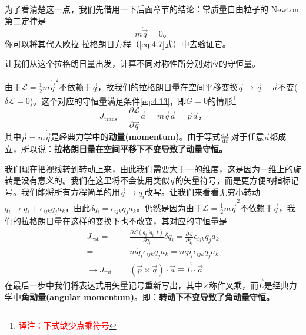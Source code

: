 为了看清楚这一点，我们先借用一下后面章节的结论：常质量自由粒子的 Newton 第二定律是%
\begin{equation}
m{\ddot\vec{q}} = 0 \text{。}
\end{equation}
你可以将其代入欧拉-拉格朗日方程（\ref{eq:4.7}式）中去验证它。

让我们从这个拉格朗日量出发，计算不同对称性所分别对应的守恒量。

由于${\mathcal L}=\frac{1}{2}m{\dot\vec q}^2$不依赖于$\vec q$，故我们的拉格朗日量在空间平移变换$\vec{q}\rightarrow\vec{q}+\vec{a}$不变($\delta{\mathcal L}=0$)。这个对应的守恒量满足条件\ref{eq:4.13}，即$G=0$的情形\footnote{\textcolor{red}{译注：下式缺少点乘符号}}
\begin{equation}
J_\text{trans} = \frac{\partial\mathcal L}{\partial \dot\vec q} \vec a = m {\dot\vec q} {\vec a} = \vec{p}\vec{a} \text{，}
\end{equation}
其中$\vec{p}=m{\dot\vec q}$是经典力学中的{\bf 动量(momentum)}。由于等式$\frac{\mathrm d J}{\mathrm d t}$对于任意$\vec a$都成立，所以说：{\bf 拉格朗日量在空间平移下不变导致了动量守恒。}

我们现在把视线转到转动上来，由此我们需要大于一的维度，这是因为一维上的旋转是没有意义的。我们在这里将不会使用类似$\vec q$的矢量符号，而是更方便的指标记号。我们能将所有方程简单的用$\vec{q}\rightarrow q_i$改写。让我们来看看无穷小转动%
%
$q_i \rightarrow q_i + \epsilon_{ijk} q_j a_k$，由此$\delta q_i=\epsilon_{ijk}q_j a_k$。仍然是因为由于${\mathcal L}=\frac{1}{2}m{\dot\vec q}^2$不依赖于$\vec q$，我们的拉格朗日量在这样的变换下也不改变，其对应的守恒量是%
\begin{equation}
\begin{aligned}
J_\text{rot} =& \frac{\partial {\mathcal L}(q_i, \dot q_i, t)}{\partial \dot q_i}\delta q_i  = \frac{\partial \mathcal L}{\partial \dot q_i} \epsilon_{ijk} q_j a_k \\
  =& m {\dot q_i} \epsilon_{ijk} q_j a_k = m p_i\epsilon_{ijk} q_j a_k \\
  \rightarrow J_\text{rot} =& (\vec{p}\times\vec{q})\cdot\vec{a} \equiv \vec{L}\cdot\vec{a}
\end{aligned}
\end{equation}
在最后一步中我们将表达式用矢量记号重新写出，其中$\times$称作叉乘，而$\vec L$是经典力学中{\bf 角动量(angular momentum)}。即：{\bf 转动下不变导致了角动量守恒。}

